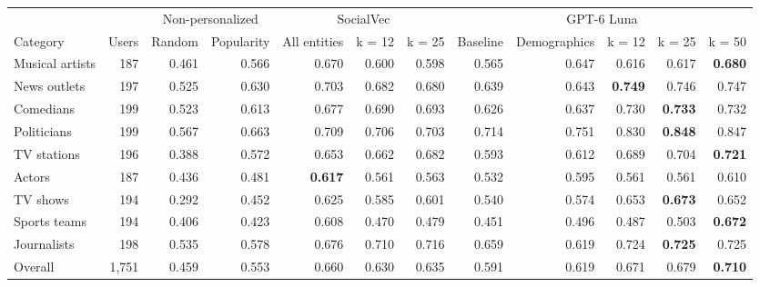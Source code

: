 \begin{tabular}{lrrrrrrrrrrr}
\toprule
 &  & \multicolumn{2}{c}{Non-personalized} & \multicolumn{3}{c}{SocialVec} & \multicolumn{5}{c}{GPT-6 Luna} \\
Category & Users & Random & Popularity & All entities & k = 12 & k = 25 & Baseline & Demographics & k = 12 & k = 25 & k = 50 \\
\midrule
Musical artists & 187 & 0.461 & 0.566 & 0.670 & 0.600 & 0.598 & 0.565 & 0.647 & 0.616 & 0.617 & \textbf{0.680} \\
News outlets & 197 & 0.525 & 0.630 & 0.703 & 0.682 & 0.680 & 0.639 & 0.643 & \textbf{0.749} & 0.746 & 0.747 \\
Comedians & 199 & 0.523 & 0.613 & 0.677 & 0.690 & 0.693 & 0.626 & 0.637 & 0.730 & \textbf{0.733} & 0.732 \\
Politicians & 199 & 0.567 & 0.663 & 0.709 & 0.706 & 0.703 & 0.714 & 0.751 & 0.830 & \textbf{0.848} & 0.847 \\
TV stations & 196 & 0.388 & 0.572 & 0.653 & 0.662 & 0.682 & 0.593 & 0.612 & 0.689 & 0.704 & \textbf{0.721} \\
Actors & 187 & 0.436 & 0.481 & \textbf{0.617} & 0.561 & 0.563 & 0.532 & 0.595 & 0.561 & 0.561 & 0.610 \\
TV shows & 194 & 0.292 & 0.452 & 0.625 & 0.585 & 0.601 & 0.540 & 0.574 & 0.653 & \textbf{0.673} & 0.652 \\
Sports teams & 194 & 0.406 & 0.423 & 0.608 & 0.470 & 0.479 & 0.451 & 0.496 & 0.487 & 0.503 & \textbf{0.672} \\
Journalists & 198 & 0.535 & 0.578 & 0.676 & 0.710 & 0.716 & 0.659 & 0.619 & 0.724 & \textbf{0.725} & 0.725 \\
\midrule
Overall & 1,751 & 0.459 & 0.553 & 0.660 & 0.630 & 0.635 & 0.591 & 0.619 & 0.671 & 0.679 & \textbf{0.710} \\
\bottomrule
\end{tabular}
